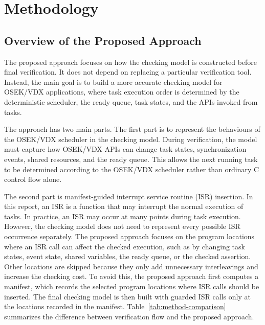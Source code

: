 \section{Methodology}
\label{sec:method}

\subsection{Overview of the Proposed Approach}

The proposed approach focuses on how the checking model is constructed before final verification. It does not depend on replacing a particular verification tool. Instead, the main goal is to build a more accurate checking model for OSEK/VDX applications, where task execution order is determined by the deterministic scheduler, the ready queue, task states, and the APIs invoked from tasks.

The approach has two main parts. The first part is to represent the behaviours of the OSEK/VDX scheduler in the checking model. During verification, the model must capture how OSEK/VDX APIs can change task states, synchronization events, shared resources, and the ready queue. This allows the next running task to be determined according to the OSEK/VDX scheduler rather than ordinary C control flow alone.

The second part is manifest-guided interrupt service routine (ISR) insertion. In this report, an ISR is a function that may interrupt the normal execution of tasks. In practice, an ISR may occur at many points during task execution. However, the checking model does not need to represent every possible ISR occurrence separately. The proposed approach focuses on the program locations where an ISR call can affect the checked execution, such as by changing task states, event state, shared variables, the ready queue, or the checked assertion. Other locations are skipped because they only add unnecessary interleavings and increase the checking cost. To avoid this, the proposed approach first computes a manifest, which records the selected program locations where ISR calls should be inserted. The final checking model is then built with guarded ISR calls only at the locations recorded in the manifest. Table~\ref{tab:method-comparison} summarizes the difference between verification flow
and the proposed approach.

